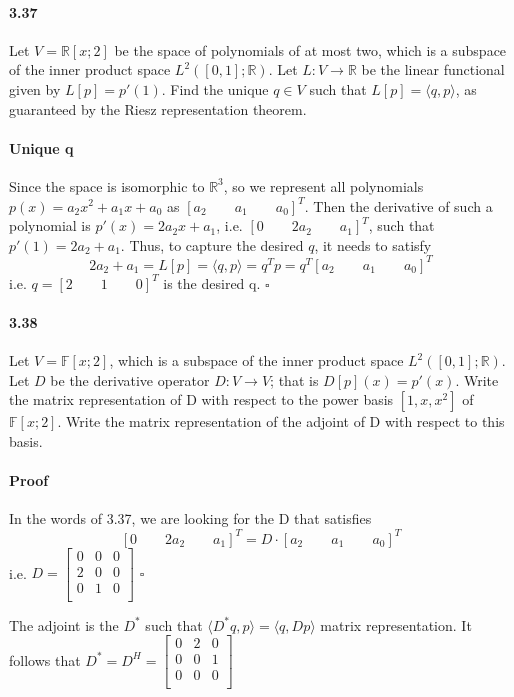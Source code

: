 \documentclass[letterpaper,12pt]{article}
\theoremstyle{definition}
\begin{document}
\paragraph{3.37} Let $V =  \mathds{R}[x;2]$ be the space of polynomials of at most two, which is a subspace of the inner product space $L^2([0,1];\mathds{R})$. Let $L: V \rightarrow \mathds{R}$ be the linear functional  given by $L[p] = p'(1)$. Find the unique $q \in V$ such that $L[p] = \langle q, p \rangle$, as guaranteed by the Riesz representation theorem.

\paragraph{Unique q} Since the space is isomorphic to $\mathds{R}^3$, so we represent all polynomials $p(x) = a_2 x^2 + a_1 x + a_0$ as $[a_2 \qquad a_1 \qquad a_0]^T$. Then the derivative of such a polynomial is $p'(x) = 2a_2 x + a_1$, i.e. $[0 \qquad 2a_2 \qquad a_1]^T$, such that $p'(1) = 2a_2 + a_1$. Thus, to capture the desired $q$, it needs to satisfy  $$2a_2 + a_1 = L[p] = \langle q, p \rangle = q^Tp = q^T [a_2 \qquad a_1 \qquad a_0]^T $$
i.e. $ q =  [2 \qquad 1 \qquad 0]^T$ is the desired q. $\square$


\paragraph{3.38} Let $V = \mathds{F}[x;2]$, which is a subspace of the inner product space $L^2([0,1];\mathds{R})$. Let $D$ be the derivative operator $D: V \rightarrow V$; that is $D[p](x) = p'(x)$. Write the matrix representation of D with respect to the power basis $[1, x, x^2]$ of $\mathds{F}[x;2]$. Write the matrix representation of the adjoint of D with respect to this basis.

\paragraph{Proof} In the words of 3.37, we are looking for the D that satisfies $$[0 \qquad 2a_2 \qquad a_1]^T = D \cdot [a_2 \qquad a_1 \qquad a_0]^T $$ i.e. $D = 
\begin{bmatrix}
    0 & 0 & 0\\
    2 & 0 & 0\\
    0 & 1 & 0\\
\end{bmatrix}
  $ $\square$

The adjoint is the $D^*$ such that $\langle D^*q, p \rangle = \langle q, D p \rangle$ matrix representation. It  follows that $D^* = D^H = \begin{bmatrix}
    0 & 2 & 0\\
    0 & 0 & 1\\
    0 & 0 & 0\\
\end{bmatrix}$
\end{document}
